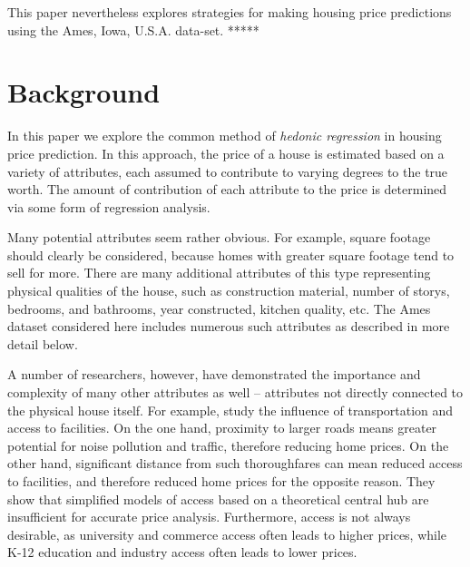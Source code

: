 \documentclass[fleqn,10pt]{SelfArx} %
\begin{document}
This paper nevertheless explores strategies for making housing price predictions using the Ames, Iowa, U.S.A. data-set. *****




\section{Background}

In this paper we explore the common method of {\it hedonic regression} in housing price prediction. In this approach, the price of a house is estimated based on a variety of attributes, each assumed to contribute to varying degrees to the true worth. The amount of contribution of each attribute to the price is determined via some form of regression analysis.

Many potential attributes seem rather obvious. For example, square footage should clearly be considered, because homes with greater square footage tend to sell for more. There are many additional attributes of this type representing physical qualities of the house, such as construction material, number of storys, bedrooms, and bathrooms, year constructed, kitchen quality, etc. The Ames dataset considered here includes numerous such attributes as described in more detail below.

A number of researchers, however, have demonstrated the importance and complexity of many other attributes as well -- attributes not directly connected to the physical house itself. For example,  study the influence of transportation and access to facilities. On the one hand, proximity to larger roads means greater potential for noise pollution and traffic, therefore reducing home prices. On the other hand, significant distance from such thoroughfares can mean reduced access to facilities, and therefore reduced home prices for the opposite reason. They show that simplified models of access based on a theoretical central hub are insufficient for accurate price analysis. Furthermore, access is not always desirable, as university and commerce access often leads to higher prices, while K-12 education and industry access often leads to lower prices.
\end{document}

